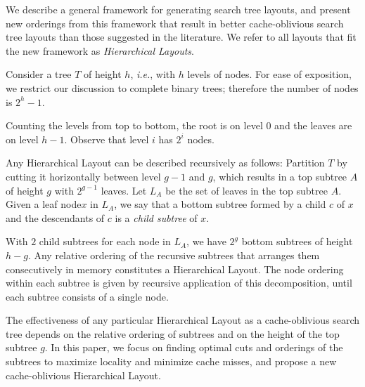 \documentclass[10pt,conference,letterpaper]{IEEEtran}
\newcommand{\comment}[1]{}
\newcommand{\node}{node\xspace}
\newcommand{\nodes}{nodes\xspace}
\newcommand{\HL}{Hierarchical Layout\xspace}
\newcommand{\ie}{{\it i.e.}\xspace}
\begin{document}
We describe a general framework for generating search tree layouts, and present new orderings from this framework that result in better cache-oblivious search tree layouts than those suggested in the literature. We refer to all layouts that fit the new framework as \emph{Hierarchical Layouts}. 

\comment{Furthermore, major improvements can often be obtained by considering simple-to-describe modifications to the layouts used currently, which we show are special cases of a general framework for generating layouts. We refer to all layouts that fit the general framework as \emph{Hierarchical Layouts}. 
}

Consider a tree $T$ of height $h$, \ie, with $h$ levels of \nodes. For ease of exposition, we restrict our discussion to complete binary trees;  therefore the number of \nodes is $2^h-1$. 
\comment{We can think of any \node in this tree as belonging to a particular level, where}
Counting the levels from top to bottom, the root is on level $0$ and the leaves are on level $h-1$.
Observe that level $i$ has $2^i$ \nodes. 

Any \HL can be described recursively as follows:
Partition $T$ by cutting it horizontally between level $g-1$ and $g$, which results in a top subtree $A$ of height $g$ with
$2^{g-1}$ leaves.
Let $L_A$ be the set of leaves in the top subtree $A$.
Given a leaf \node $x$ in $L_A$, we say that a bottom subtree formed by a child $c$ of $x$ and the descendants of $c$ is a \textit{child subtree} of $x$.
\comment{Since there are }
With $2$ child subtrees for each \node in $L_A$, we have $2^g$ bottom subtrees 
of height $h-g$.
Any relative ordering of the recursive subtrees that arranges them consecutively in memory constitutes a \HL. 
The \node ordering within each subtree is given by recursive application of this
decomposition, until each subtree consists of a single \node.
\comment{
To ensure that the exact position of top subtree $A$'s root vertex is consistent with its ordering relative to the bottom subtrees (in- or pre-order), all the subtrees recursively obtained as top subtrees in subsequent cuts of top subtree $A$ must be arranged in the same fashion.
}

The effectiveness of any particular \HL as a cache-oblivious search tree depends on the relative ordering of subtrees and on the height of the top subtree $g$. In this paper, we focus on finding optimal cuts and orderings of the subtrees to maximize locality and minimize cache misses, and propose a new cache-oblivious \HL.
\end{document}
